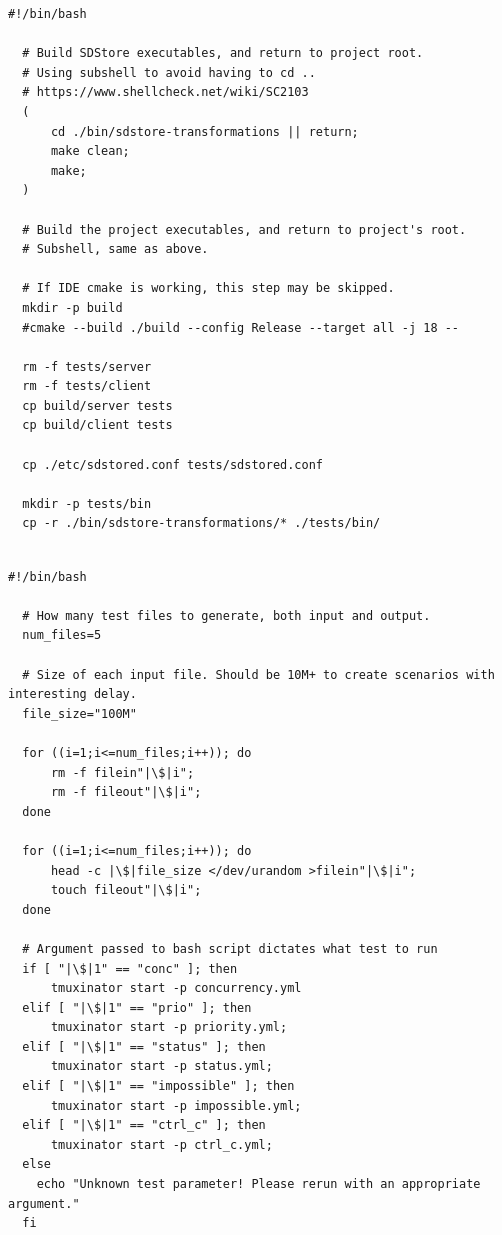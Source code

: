 \documentclass[11pt,a4paper]{report}%
\begin{document}
\label{code:compile_sh}
\begin{lstlisting}[caption={Script Bash de compilação}]
  #!/bin/bash

  # Build SDStore executables, and return to project root.
  # Using subshell to avoid having to cd ..
  # https://www.shellcheck.net/wiki/SC2103
  (
      cd ./bin/sdstore-transformations || return;
      make clean;
      make;
  )
  
  # Build the project executables, and return to project's root.
  # Subshell, same as above.
  
  # If IDE cmake is working, this step may be skipped.
  mkdir -p build
  #cmake --build ./build --config Release --target all -j 18 --
  
  rm -f tests/server
  rm -f tests/client
  cp build/server tests
  cp build/client tests
  
  cp ./etc/sdstored.conf tests/sdstored.conf
  
  mkdir -p tests/bin
  cp -r ./bin/sdstore-transformations/* ./tests/bin/
  
\end{lstlisting}

\label{code:test_sh}
\begin{lstlisting}[caption={Script Bash de teste}]
  #!/bin/bash

  # How many test files to generate, both input and output.
  num_files=5
  
  # Size of each input file. Should be 10M+ to create scenarios with interesting delay.
  file_size="100M"
  
  for ((i=1;i<=num_files;i++)); do
      rm -f filein"|\$|i";
      rm -f fileout"|\$|i";
  done
  
  for ((i=1;i<=num_files;i++)); do
      head -c |\$|file_size </dev/urandom >filein"|\$|i";
      touch fileout"|\$|i";
  done
  
  # Argument passed to bash script dictates what test to run
  if [ "|\$|1" == "conc" ]; then
      tmuxinator start -p concurrency.yml
  elif [ "|\$|1" == "prio" ]; then
      tmuxinator start -p priority.yml;
  elif [ "|\$|1" == "status" ]; then
      tmuxinator start -p status.yml;
  elif [ "|\$|1" == "impossible" ]; then
      tmuxinator start -p impossible.yml;
  elif [ "|\$|1" == "ctrl_c" ]; then
      tmuxinator start -p ctrl_c.yml;
  else
    echo "Unknown test parameter! Please rerun with an appropriate argument."
  fi
\end{lstlisting}
\end{document}
